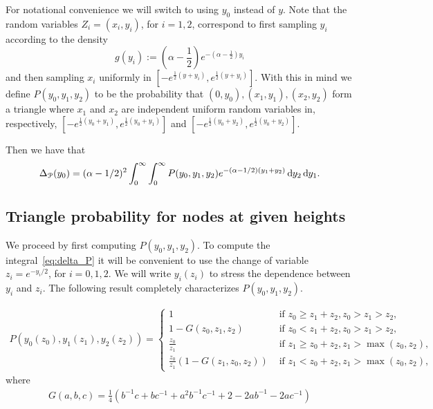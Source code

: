 For notational convenience we will switch to using $y_0$ instead of $y$. Note that the random variables $Z_i = (x_i,y_i)$, for $i = 1,2$, correspond to first sampling $y_i$ according to the density
\[
	g(y_i) := \left(\alpha -\frac{1}{2}\right) e^{-(\alpha-\frac{1}{2})y_i}
\] 
and then sampling $x_i$ uniformly in $[-e^{\frac{1}{2}(y+y_i)},e^{\frac{1}{2}(y+y_i)}]$. With this in mind we define $P(y_0,y_1,y_2)$ to be the probability that $(0,y_0), (x_1,y_1), (x_2,y_2)$ form a triangle where $x_1$ and $x_2$ are independent uniform random variables in, respectively, $[-e^{\frac{1}{2}(y_0+y_1)},e^{\frac{1}{2}(y_0+y_1)}]$ and  $[-e^{\frac{1}{2}(y_0+y_2)},e^{\frac{1}{2}(y_0+y_2)}]$.

Then we have that
\begin{align}\label{eq:delta_P}
 \Delta_{{\mathcal P}}(y_0) = (\alpha-1/2)^2 \int_0^\infty \int_0^\infty P(y_0, y_1, y_2) e^{-(\alpha-1/2)(y_1+y_2)} 
 \operatorname{\mathrm{d}\hspace{-2pt}} y_2 \operatorname{\mathrm{d}\hspace{-2pt}} y_1.
\end{align}

\subsection{Triangle probability for nodes at given heights}
We proceed by first computing $P(y_0,y_1,y_2)$. To compute the integral~\eqref{eq:delta_P} it will be convenient to use the change of variable $z_i = e^{-y_i/2}$, for $i= 0, 1, 2$. We will write $y_i(z_i)$ to stress the dependence between $y_i$ and $z_i$. The following result completely characterizes $P(y_0,y_1,y_2)$.

\begin{lemma}\label{lem:triangle_prob_y_coordinates}
\begin{align*}
P(y_0(z_0),y_1(z_1),y_2(z_2)) = \begin{cases}
	1 &\text{ if } z_0 \geq z_1+z_2, z_0 > z_1 > z_2, \\
	1-G(z_0,z_1,z_2) &\text{ if } z_0 < z_1+z_2, z_0 > z_1 > z_2, \\
	\frac{z_0}{z_1} &\text{ if } z_1 \geq z_0+z_2, z_1 > \max(z_0,z_2), \\
	\frac{z_0}{z_1}\left(1-G(z_1,z_0,z_2)\right) &\text{ if } z_1 < z_0+z_2, z_1 > \max(z_0,z_2),
\end{cases}
\end{align*}
where 
\begin{align*}
G(a,b,c) = \frac{1}{4}
\left( b^{-1}c + bc^{-1} + a^2b^{-1}c^{-1} + 2 - 2ab^{-1}-2ac^{-1}\right)
\end{align*}
\end{lemma}


